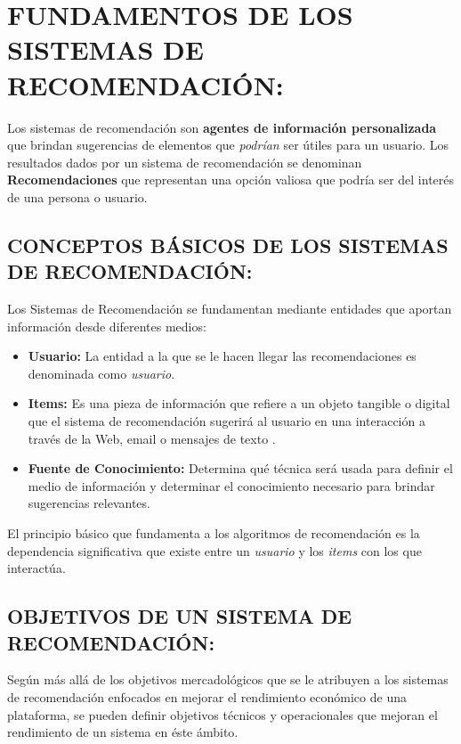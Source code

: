 \section{FUNDAMENTOS DE LOS SISTEMAS DE RECOMENDACIÓN: }

Los sistemas de recomendación son \textbf{agentes de información personalizada} que brindan sugerencias de elementos que \textit{podrían} ser útiles para un usuario.  Los resultados dados por un sistema de recomendación se denominan \textbf{Recomendaciones} que representan una opción valiosa que podría ser del interés de una persona o usuario.

\subsection[CONCEPTOS BÁSICOS]{CONCEPTOS BÁSICOS DE LOS SISTEMAS DE RECOMENDACIÓN: }


Los Sistemas de Recomendación se fundamentan mediante entidades que aportan información desde diferentes medios:

\begin{itemize}
    \item \textbf{Usuario: } La entidad a la que se le hacen llegar las recomendaciones es denominada como \textit{usuario}. 
    \item \textbf{Items: } Es una pieza de información que refiere a un objeto tangible o digital que el sistema de recomendación sugerirá al usuario en una interacción a través de la Web, email o mensajes de texto \parencite{Kotkov2020Serendipity}.
    \item \textbf{Fuente de Conocimiento: } Determina qué técnica será usada para definir el medio de información y determinar el conocimiento necesario para brindar sugerencias relevantes.
\end{itemize}

El principio básico que fundamenta a los algoritmos de recomendación es la dependencia significativa que existe entre un \textit{usuario} y los \textit{items} con los que interactúa.

\newpage
\thispagestyle{plain}
\vspace*{0.2cm}

\subsection[OBJETIVOS GENERALES]{OBJETIVOS DE UN SISTEMA DE RECOMENDACIÓN: }

Según \parencite{Aggarwal2016} más allá de los objetivos mercadológicos que se le atribuyen a los sistemas de recomendación enfocados en mejorar el rendimiento económico de una plataforma, se pueden definir objetivos técnicos y operacionales que mejoran el rendimiento de un sistema en éste ámbito.

